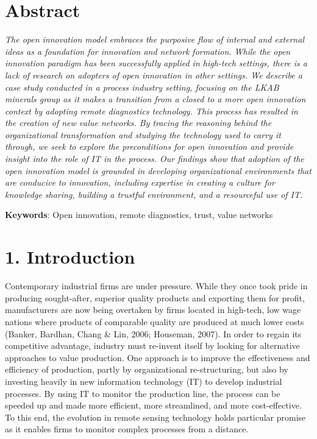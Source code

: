 \documentclass[]{article}
\begin{document}
\section{Abstract}\label{abstract-1}

\emph{The open innovation model embraces the purposive flow of internal
and external ideas as a foundation for innovation and network formation.
While the open innovation paradigm has been successfully applied in
high-tech settings, there is a lack of research on adopters of open
innovation in other settings. We describe a case study conducted in a
process industry setting, focusing on the LKAB minerals group as it
makes a transition from a closed to a more open innovation context by
adopting remote diagnostics technology. This process has resulted in the
creation of new value networks. By tracing the reasoning behind the
organizational transformation and studying the technology used to carry
it through, we seek to explore the preconditions for open innovation and
provide insight into the role of IT in the process. Our findings show
that adoption of the open innovation model is grounded in developing
organizational environments that are conducive to innovation, including
expertise in creating a culture for knowledge sharing, building a
trustful environment, and a resourceful use of IT.}

\textbf{Keywords}: Open innovation, remote diagnostics, trust, value
networks

\section{1. Introduction}\label{introduction}

Contemporary industrial firms are under pressure. While they once took
pride in producing sought-after, superior quality products and exporting
them for profit, manufacturers are now being overtaken by firms located
in high-tech, low wage nations where products of comparable quality are
produced at much lower costs (Banker, Bardhan, Chang \& Lin, 2006;
Houseman, 2007). In order to regain its competitive advantage, industry
must re-invent itself by looking for alternative approaches to value
production. One approach is to improve the effectiveness and efficiency
of production, partly by organizational re-structuring, but also by
investing heavily in new information technology (IT) to develop
industrial processes. By using IT to monitor the production line, the
process can be speeded up and made more efficient, more streamlined, and
more cost-effective. To this end, the evolution in remote sensing
technology holds particular promise as it enables firms to monitor
complex processes from a distance.
\end{document}
